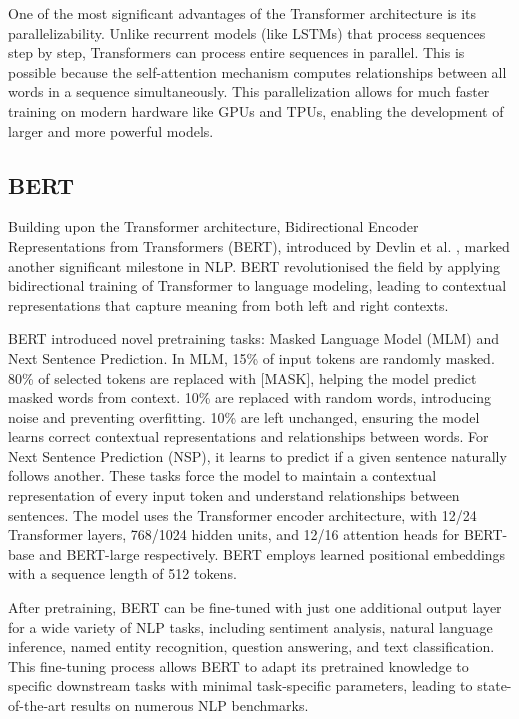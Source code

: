 \documentclass[a4paper, oneside]{discothesis}
\begin{document}
One of the most significant advantages of the Transformer architecture is its parallelizability. Unlike recurrent models (like LSTMs) that process sequences step by step, Transformers can process entire sequences in parallel. This is possible because the self-attention mechanism computes relationships between all words in a sequence simultaneously. This parallelization allows for much faster training on modern hardware like GPUs and TPUs, enabling the development of larger and more powerful models.

\subsection{BERT}
Building upon the Transformer architecture, Bidirectional Encoder Representations from Transformers (BERT), introduced by Devlin et al. \cite{devlin2018bert}, marked another significant milestone in NLP. BERT revolutionised the field by applying bidirectional training of Transformer to language modeling, leading to contextual representations that capture meaning from both left and right contexts.

BERT introduced novel pretraining tasks: Masked Language Model (MLM) and Next Sentence Prediction. In MLM, 15\% of input tokens are randomly masked. 80\% of selected tokens are replaced with [MASK], helping the model predict masked words from context. 10\% are replaced with random words, introducing noise and preventing overfitting. 10\% are left unchanged, ensuring the model learns correct contextual representations and relationships between words. For Next Sentence Prediction (NSP), it learns to predict if a given sentence naturally follows another. These tasks force the model to maintain a contextual representation of every input token and understand relationships between sentences.
The model uses the Transformer encoder architecture, with 12/24 Transformer layers, 768/1024 hidden units, and 12/16 attention heads for BERT-base and BERT-large respectively. BERT employs learned positional embeddings with a sequence length of 512 tokens.

After pretraining, BERT can be fine-tuned with just one additional output layer for a wide variety of NLP tasks, including sentiment analysis, natural language inference, named entity recognition, question answering, and text classification. 
This fine-tuning process allows BERT to adapt its pretrained knowledge to specific downstream tasks with minimal task-specific parameters, leading to state-of-the-art results on numerous NLP benchmarks.
\end{document}
